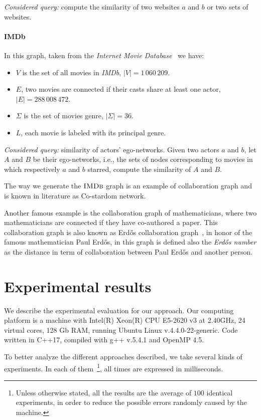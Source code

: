 \textsl{Considered query:} compute the similarity of two websites $a$ and $b$ or two sets of websites.

\paragraph*{IMDb} In this graph, taken from the \textit{Internet Movie Database}~\cite{imdb} we have:

\begin{itemize}
	\item $V$ is the set of all movies in \textit{IMDb},  $|V| = 1\,060\,209$.
	\item $E$, two movies are connected if their casts share at least one actor, $|E| = 288\,008\,472$.
	\item $\Sigma$ is the set of movies genre, $|\Sigma| = 36$.
	\item $L$, each movie is labeled with its principal genre.
\end{itemize}

\textsl{Considered query:} similarity of actors' ego-networks. Given two actors $a$ and $b$, let $A$ and $B$ be their ego-networks, i.e., the sets of nodes corresponding to movies in which respectively $a$ and $b$ starred, compute the similarity of $A$ and $B$.\medskip

The way we generate the $\textsc{IMDb}$ graph is an example of collaboration graph and is known in literature as Co-stardom network. 

Another famous example is the collaboration graph of mathematicians, where two mathematicians are connected if they have co-authored a paper. 
This collaboration graph is also known as Erdős collaboration graph~\cite{BATAGELJ2000173}, in honor of the famous mathematician Paul Erdős, in this graph is defined also the \textit{Erdős number} as the distance in term of collaboration between Paul Erdős and another person.

\section{Experimental results}

We describe the experimental evaluation for our approach. Our computing platform is a machine with Intel(R) Xeon(R) CPU E5-2620 v3 at 2.40GHz, 24 virtual cores, 128 Gb RAM, running Ubuntu Linux v.4.4.0-22-generic. Code written in C++17, compiled with g++ v.5.4.1 and OpenMP 4.5.\medskip

To better analyze the different approaches described, we take several kinds of experiments. In each of them~\footnote{Unless otherwise stated, all the results are the average of $100$ identical experiments, in order to reduce the possible errors randomly caused by the machine.}, all times are expressed in milliseconds.\medskip

